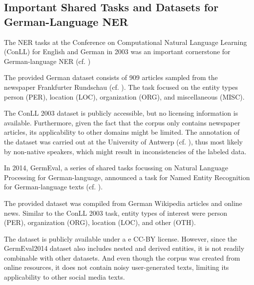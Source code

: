 \subsection{Important Shared Tasks and Datasets for German-Language NER}

The NER tasks at the Conference on Computational Natural Language Learning (ConLL) for English and German in 2003 was an important cornerstone for German-language NER (cf. \cite{tjong_kim_sang_introduction_2003}) 

The provided German dataset consists of 909 articles sampled from the newspaper Frankfurter Rundschau (cf. \cite{tjong_kim_sang_introduction_2003}). The task focused on the entity types person (PER), location (LOC), organization (ORG), and miscellaneous (MISC). 


The ConLL 2003 dataset is publicly accessible, but no licensing information is available. Furthermore, given the fact that the corpus only contains newspaper articles, its applicability to other domains might be limited. The annotation of the dataset was carried out at the University of Antwerp (cf. \cite{tjong_kim_sang_introduction_2003}), thus most likely by non-native speakers, which might result in inconsistencies of the labeled data.

In 2014, GermEval, a series of shared tasks focussing on Natural Language Processing for German-language, announced a task for Named Entity Recognition for German-language texts (cf. \cite{benikova-etal-2014-nosta}). 

The provided dataset was compiled from German Wikipedia articles and online news. Similar to the ConLL 2003 task, entity types of interest were person (PER), organization (ORG), location (LOC), and other (OTH). 

The dataset is publicly available under a e CC-BY license.  However, since the GermEval2014 dataset also includes nested and derived entities, it is not readily combinable with other datasets. And even though the corpus was created from online resources, it does not contain noisy user-generated texts, limiting its applicability to other social media texts. 


